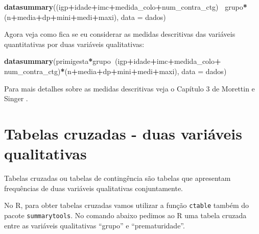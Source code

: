 \documentclass[
]{book}
\newenvironment{Shaded}{\begin{snugshade}}{\end{snugshade}}
\newcommand{\DataTypeTok}[1]{\textcolor[rgb]{0.13,0.29,0.53}{#1}}
\newcommand{\KeywordTok}[1]{\textcolor[rgb]{0.13,0.29,0.53}{\textbf{#1}}}
\newcommand{\NormalTok}[1]{#1}
\newcommand{\OperatorTok}[1]{\textcolor[rgb]{0.81,0.36,0.00}{\textbf{#1}}}
\newcommand{\StringTok}[1]{\textcolor[rgb]{0.31,0.60,0.02}{#1}}
\begin{document}
\begin{Shaded}
\begin{Highlighting}[]
\KeywordTok{datasummary}\NormalTok{((igp}\OperatorTok{+}\NormalTok{idade}\OperatorTok{+}\NormalTok{imc}\OperatorTok{+}\NormalTok{medida_colo}\OperatorTok{+}\NormalTok{num_contra_ctg)}\OperatorTok{~}
\StringTok{              }\NormalTok{grupo}\OperatorTok{*}\NormalTok{(n}\OperatorTok{+}\NormalTok{media}\OperatorTok{+}\NormalTok{dp}\OperatorTok{+}\NormalTok{mini}\OperatorTok{+}\NormalTok{medi}\OperatorTok{+}\NormalTok{maxi), }\DataTypeTok{data =}\NormalTok{ dados)}
\end{Highlighting}
\end{Shaded}

Agora veja como fica se eu considerar as medidas descritivas das variáveis quantitativas por duas variáveis qualitativas:

\begin{Shaded}
\begin{Highlighting}[]
\KeywordTok{datasummary}\NormalTok{(primigesta}\OperatorTok{*}\NormalTok{grupo}\OperatorTok{~}\NormalTok{(igp}\OperatorTok{+}\NormalTok{idade}\OperatorTok{+}\NormalTok{imc}\OperatorTok{+}\NormalTok{medida_colo}\OperatorTok{+}
\StringTok{  }\NormalTok{num_contra_ctg)}\OperatorTok{*}\NormalTok{(n}\OperatorTok{+}\NormalTok{media}\OperatorTok{+}\NormalTok{dp}\OperatorTok{+}\NormalTok{mini}\OperatorTok{+}\NormalTok{medi}\OperatorTok{+}\NormalTok{maxi), }\DataTypeTok{data =}\NormalTok{ dados)}
\end{Highlighting}
\end{Shaded}

Para mais detalhes sobre as medidas descritivas veja o Capítulo 3 de Morettin e Singer \citep{morettin2020introduccaoa}.

\hypertarget{tabelas-cruzadas---duas-variuxe1veis-qualitativas}{%
\section{Tabelas cruzadas - duas variáveis qualitativas}\label{tabelas-cruzadas---duas-variuxe1veis-qualitativas}}

Tabelas cruzadas ou tabelas de contingência são tabelas que apresentam frequências de duas variáveis qualitativas conjuntamente.

No R, para obter tabelas cruzadas vamos utilizar a função \texttt{ctable} também do pacote \texttt{summarytools}. No comando abaixo pedimos ao R uma tabela cruzada entre as variáveis qualitativas ``grupo'' e ``prematuridade''.
\end{document}
